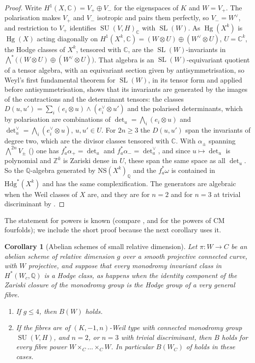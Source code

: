 \documentclass[11pt,reqno]{amsart}
\theoremstyle{plain}
\newtheorem{corollary}[theorem]{Corollary}
\theoremstyle{definition}
\theoremstyle{remark}
\newcommand{\QQ}{\mathbb{Q}}
\newcommand{\ZZ}{\mathbb{Z}}
\newcommand{\CC}{\mathbb{C}}
\newcommand{\Hdg}{\mathrm{Hdg}}
\newcommand{\NS}{\mathrm{NS}}
\DeclareMathOperator{\Hg}{Hg}
\DeclareMathOperator{\SL}{SL}
\DeclareMathOperator{\SU}{SU}
\begin{document}
\begin{proof}
Write $H^{1}(X,\CC)=V_{+}\oplus V_{-}$ for the eigenspaces of $K$ and
$W=V_{+}$. The polarisation makes $V_{+}$ and $V_{-}$ isotropic and pairs them
perfectly, so $V_{-}=W^{\vee}$, and restriction to $V_{+}$ identifies
$\SU(V,H)_{\CC}$ with $\SL(W)$. As $\Hg(X^{k})$ is $\Hg(X)$ acting diagonally
on $H^{1}(X^{k},\CC)=(W\otimes U)\oplus(W^{\vee}\otimes U)$, $U=\CC^{k}$, the
Hodge classes of $X^{k}$, tensored with $\CC$, are the $\SL(W)$-invariants in
$\bigwedge^{*}\bigl((W\otimes U)\oplus(W^{\vee}\otimes U)\bigr)$. That algebra
is an $\SL(W)$-equivariant quotient of a tensor algebra, with an equivariant
section given by antisymmetrisation, so Weyl's first fundamental theorem for
$\SL(W)$, in its tensor form and applied before antisymmetrisation, shows
that its invariants are generated by the images of the contractions and the
determinant tensors: the classes
$D(u,u')=\sum_{i}(e_{i}\otimes u)\wedge(e_{i}^{\vee}\otimes u')$ and the
polarised determinants, which by polarisation are combinations of
$\det_{u}=\bigwedge_{i}(e_{i}\otimes u)$ and
$\det^{\vee}_{u}=\bigwedge_{i}(e_{i}^{\vee}\otimes u)$, $u,u'\in U$. For
$2n\ge3$ the $D(u,u')$ span the invariants of degree two, which are the
divisor classes tensored with $\CC$. With $\alpha_{\pm}$ spanning
$\bigwedge^{2n}V_{\pm}$ (\cite[Proposition~3.7]{paperI}) one has
$f_{a}^{*}\alpha_{+}=\det_{a}$ and $f_{a}^{*}\alpha_{-}=\det^{\vee}_{a}$, and
since $u\mapsto\det_{u}$ is polynomial and $\ZZ^{k}$ is Zariski dense in
$U$, these span the same space as all $\det_{u}$. So the $\QQ$-algebra
generated by $\NS(X^{k})_{\QQ}$ and the $f_{a}^{*}\omega$ is contained in
$\Hdg^{*}(X^{k})$ and has the same complexification. The generators are
algebraic when the Weil classes of $X$ are, and they are for $n=2$ and for
$n=3$ at trivial discriminant by \cite{Mar25a}.
\end{proof}

The statement for powers is known (compare \cite{Mil22}, and \cite{Li26}
for the powers of CM fourfolds); we include the short proof because the next
corollary uses it.

\begin{corollary}[Abelian schemes of small relative dimension]
\label{cor:lefschetzsmall}
Let $\pi\colon W\to C$ be an abelian scheme of relative dimension $g$ over a
smooth projective connected curve, with $W$ projective, and suppose that
every monodromy invariant class in $H^{*}(W_{c},\QQ)$ is a Hodge class, as
happens when the identity component of the Zariski closure of the monodromy
group is the Hodge group of a very general fibre.
\begin{enumerate}[label=\textup{(\roman*)},leftmargin=2.6em,itemsep=2pt]
\item If $g\le4$, then $B(W)$ holds.
\item If the fibres are of $(K,-1,n)$-Weil type with connected monodromy
  group $\SU(V,H)$, and $n=2$, or $n=3$ with trivial discriminant, then
  $B$ holds for every fibre power $W\times_{C}\dots\times_{C}W$. In
  particular $B(W_{C})$ of  holds in these cases.
\end{enumerate}
\end{corollary}
\end{document}
